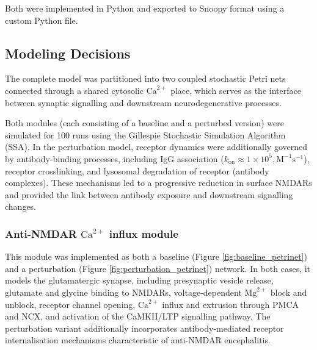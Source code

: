 \documentclass[a4paper,twoside]{article}
\begin{document}
Both were implemented in Python and exported to Snoopy format using a custom Python file.

\subsection{Modeling Decisions}
The complete model was partitioned into two coupled stochastic Petri nets connected through a shared cytosolic $\text{Ca}^{2+}$ place, which serves as the interface between synaptic signalling and downstream neurodegenerative processes. 

Both modules (each consisting of a baseline and a perturbed version)  were simulated for 100 runs using the Gillespie Stochastic Simulation Algorithm (SSA). In the perturbation model, receptor dynamics were additionally governed by antibody-binding processes, including IgG association ($k_{\mathrm{on}} \approx 1 \times 10^{5},\mathrm{M^{-1}s^{-1}}$), receptor crosslinking, and lysosomal degradation of receptor (antibody complexes). These mechanisms led to a progressive reduction in surface NMDARs and provided the link between antibody exposure and downstream signalling changes.


\subsubsection{Anti-NMDAR $\text{Ca}^{2+}$ influx module}
This module was implemented as both a baseline (Figure \ref{fig:baseline_petrinet}) and a perturbation (Figure \ref{fig:perturbation_petrinet}) network. In both cases, it models the glutamatergic synapse, including presynaptic vesicle release, glutamate and glycine binding to NMDARs, voltage-dependent $\text{Mg}^{2+}$ block and unblock, receptor channel opening, $\text{Ca}^{2+}$ influx and extrusion through PMCA and NCX, and activation of the CaMKII/LTP signalling pathway. The perturbation variant additionally incorporates antibody-mediated receptor internalisation mechanisms characteristic of anti-NMDAR encephalitis.
\end{document}
